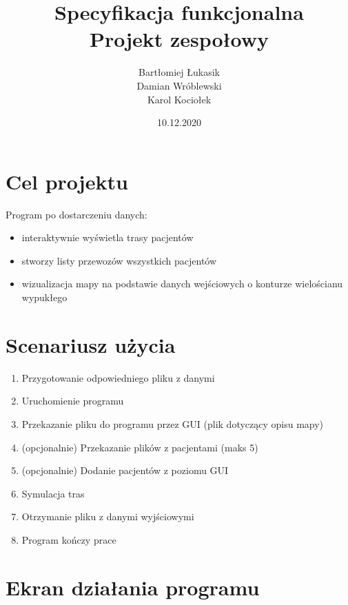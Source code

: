 \documentclass[]{article}
\title{Specyfikacja funkcjonalna\\Projekt zespołowy}
\author{Bartłomiej Łukasik\\Damian Wróblewski\\Karol Kociołek}
\date{10.12.2020}
\begin{document}
\maketitle

\section{Cel projektu}
Program po dostarczeniu danych:
\begin{itemize}
\item interaktywnie wyświetla trasy pacjentów
\item stworzy listy przewozów wszystkich pacjentów
\item wizualizacja mapy na podstawie danych wejściowych o konturze wielościanu wypukłego 
\end {itemize}



\section{Scenariusz użycia}
\begin {enumerate}
\item Przygotowanie odpowiedniego pliku z danymi
\item Uruchomienie programu
\item Przekazanie pliku do programu przez GUI (plik dotyczący opisu mapy)
\item (opcjonalnie) Przekazanie plików z pacjentami (maks 5)
\item (opcjonalnie) Dodanie pacjentów z poziomu GUI
\item Symulacja tras
\item Otrzymanie pliku z danymi wyjściowymi
\item Program kończy prace
\end {enumerate}

\section{Ekran działania programu}
\end{document}
